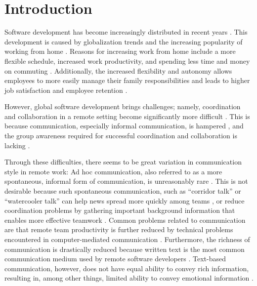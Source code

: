 \chapter{Introduction}
\label{chapter:introduction}
Software development has become increasingly distributed in recent years \autocite{herbsleb2001global}. This development is caused by globalization trends \autocite{herbsleb2007global} and the increasing popularity of working from home \autocite{ecoWorkingFromHome2021}. Reasons for increasing work from home include a more flexible schedule, increased work productivity, and spending less time and money on commuting \autocite{flores2019understanding, mulki2009set}. Additionally, the increased flexibility and autonomy allows employees to more easily manage their family responsibilities and leads to higher job satisfaction and employee retention \autocite{mulki2009set, gajendran2007good, madsen2011benefits}.

However, global software development brings challenges; namely, coordination and collaboration in a remote setting become significantly more difficult \autocite{herbsleb2007global}. This is because communication, especially informal communication, is hampered \autocite{sengupta2006research, herbsleb2007global, hinds2005understanding}, and the group awareness required for successful coordination and collaboration is lacking \autocite{herbsleb2007global, gutwin2004group}.

Through these difficulties, there seems to be great variation in communication style in remote work: Ad hoc communication, also referred to as a more spontaneous, informal form of communication, is unreasonably rare \autocite{kraut1988patterns, sengupta2006research, herbsleb2007global, hinds2005understanding}. This is not desirable because such spontaneous communication, such as \enquote{corridor talk} or \enquote{watercooler talk} can help news spread more quickly among teams \autocite{herbsleb2000distance}, or reduce coordination problems \autocite{herbsleb1999architectures} by gathering important background information that enables more effective teamwork \autocite{lanubile2007collaboration, herbsleb2001global}. Common problems related to communication are that remote team productivity is further reduced by technical problems encountered in computer-mediated communication \autocite{sengupta2006research}. Furthermore, the richness of communication is drastically reduced because written text is the most common communication medium used by remote software developers \autocite{gutwin2004group}. Text-based communication, however, does not have equal ability to convey rich information, resulting in, among other things, limited ability to convey emotional information \autocite{hook2008interactional}.


